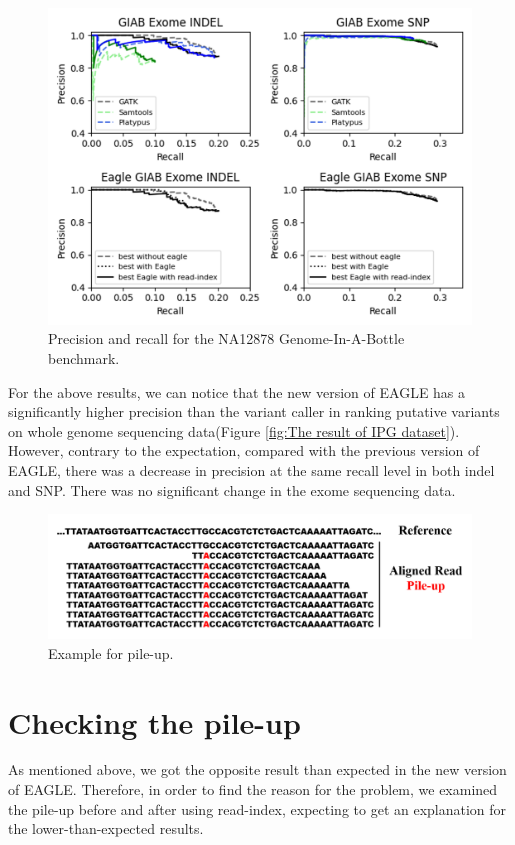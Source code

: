 \documentclass[PhD]{PHlab-thesis}
\begin{document}
\begin{figure}[h!]
	\centering
	\includegraphics[scale=0.45]{figures/GIAB result.png}
	\caption{Precision and recall for the NA12878 Genome-In-A-Bottle benchmark.}
	\label{fig:The result of GIAB dataset}
\end{figure}

For the above results, we can notice that the new version of EAGLE has a significantly higher precision than the variant caller in ranking putative variants on whole genome sequencing data(Figure \ref{fig:The result of IPG dataset}). However, contrary to the expectation, compared with the previous version of EAGLE, there was a decrease in precision at the same recall level in both indel and SNP.  There was no significant change in the exome sequencing data.

\begin{figure}[h!]
	\centering
	\includegraphics[scale=0.3]{figures/Pileup.png}
	\caption{Example for pile-up.}
	\label{fig:Example for pile-up}
\end{figure}

\section{Checking the pile-up}
As mentioned above, we got the opposite result than expected in the new version of EAGLE.  Therefore, in order to find the reason for the problem, we examined the pile-up before and after using read-index, expecting to get an explanation for the lower-than-expected results.
\end{document}
